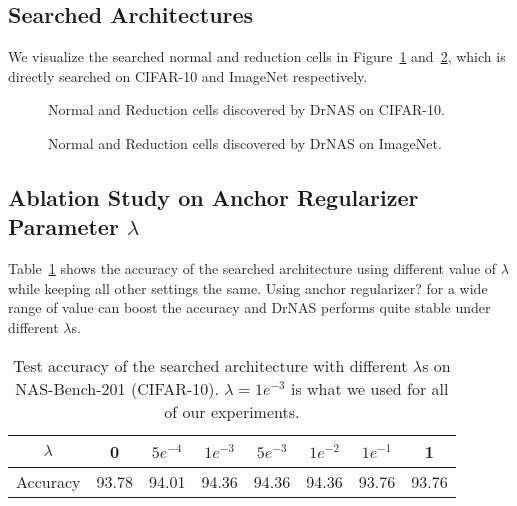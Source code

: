 \documentclass{article} \usepackage{iclr2021_conference,times}
\begin{document}
\subsection{Searched Architectures}
\label{app:vis}
We visualize the searched normal and reduction cells in Figure~\ref{fig:DrNAS_cifar10} and~\ref{fig:DrNAS_imagenet}, which is directly searched on CIFAR-10 and ImageNet respectively.

\begin{figure}[!htb]
\centering
{}
\caption{Normal and Reduction cells discovered by DrNAS on CIFAR-10.}
\label{fig:DrNAS_cifar10}
\end{figure}

\begin{figure}[!htb]
\centering
{}
\caption{Normal and Reduction cells discovered by DrNAS on ImageNet.}
\label{fig:DrNAS_imagenet}
\end{figure}

\subsection{Ablation Study on Anchor Regularizer Parameter $\lambda$}
\label{app:sensitivity}
Table~\ref{tab:sensitivity} shows the accuracy of the searched architecture using different value of $\lambda$ while keeping all other settings the same. Using anchor regularizer? for a wide range of value can boost the accuracy and DrNAS performs quite stable under different $\lambda$s.
\begin{table}[!htb]
\caption{Test accuracy of the searched architecture with different $\lambda$s on NAS-Bench-201 (CIFAR-10). $\lambda=1e^{-3}$ is what we used for all of our experiments.}
\centering
\begin{tabular}{c|c|c|c|c|c|c|c}
\hline
$\lambda$ & 0 & $5e^{-4}$ & $1e^{-3}$ & $5e^{-3}$ & $1e^{-2}$ & $1e^{-1}$ & 1 \\ \hline
Accuracy & 93.78 & 94.01 & 94.36 & 94.36 & 94.36 & 93.76 & 93.76 \\ \hline
\end{tabular}
\label{tab:sensitivity}
\end{table}
\end{document}
